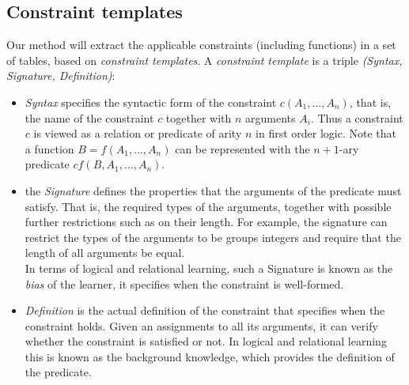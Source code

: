 \documentclass{ecai}
\newcommand{\format}[1]{\textit{#1}\xspace}
\newcommand{\template}{\format{constraint template}}
\newcommand{\CName}{Syntax\xspace}
\newcommand{\CSignature}{Signature\xspace}
\newcommand{\CFunction}{Definition\xspace}
\begin{document}
\subsection{Constraint templates}
Our method will extract the applicable constraints (including functions) in a set of tables, based on \textit{constraint templates}.
%
A \template is a triple \textit{(\CName, \CSignature, \CFunction)}:
\begin{itemize}
\item
\textit{\CName}  specifies the syntactic form of the constraint $c(A_1, ...,A_n)$, that is, the name of the constraint $c$ together
with $n$ arguments $A_i$. Thus a constraint $c$ is viewed as a relation or predicate of arity $n$ in first order logic. Note that a function $B=f(A_1,...,A_n)$ can be represented with the $n+1$-ary predicate $cf(B,A_1,...,A_n)$.

\item the \textit{\CSignature} defines the properties that the arguments of the predicate must satisfy. That is, the required types of the arguments, together
with possible further restrictions such as on their length. For example, the signature can restrict the types of the arguments to be groups integers and require that the length of all arguments be equal. \\
In terms of logical and relational learning, such a \CSignature is known as the {\em bias} of the learner, it specifies when the constraint is well-formed.

\item \textit{\CFunction} is the actual definition of the constraint that specifies when the constraint holds. Given an assignments to all its arguments, it can verify whether the constraint is satisfied or not. %
In logical and relational learning this is known as the background knowledge, which provides the definition of the predicate.
\end{itemize}
\end{document}

